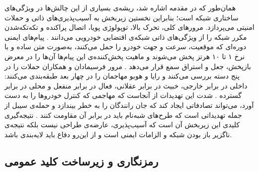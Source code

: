 همان‌طور که در مقدمه اشاره شد، ریشه‌ی بسیاری از این چالش‌ها در ویژگی‌های ساختاری شبکه است؛ بنابراین نخستین زیربخش به آسیب‌پذیری‌های ذاتی و حملات امنیتی می‌پردازد. مرورهای کلی، تحرک بالا، توپولوژی پویا، اتصال پراکنده و تکه‌تکه‌شدن مکرر شبکه را از ویژگی‌های ذاتی شبکه‌ی اقتضایی خودرویی می‌دانند \cite{hozouriOverviewVANETVehicular2023, xuInternetVehiclesBig2018}. پیام‌های ایمنی دوره‌ای که موقعیت، سرعت و جهت خودرو را حمل می‌کنند، به‌صورت متن ساده و با نرخ ۱ تا ۱۰ هرتز پخش می‌شوند \cite{al-aniPrivacySafetyImprovement2023} و ماهیت پخش‌کننده‌ی این پیام‌ها آن‌ها را در معرض بازپخش، جعل و استراق سمع قرار می‌دهد \cite{farsimadanReviewSecurityChallenges2025}. مرور فرسیمادان و همکاران حملات را در پنج دسته بررسی می‌کنند \cite{farsimadanReviewSecurityChallenges2025} و رایا و هوبو مهاجمان را در چهار بعد طبقه‌بندی می‌کنند: داخلی در برابر خارجی، خبیث در برابر عقلانی، فعال در برابر منفعل و محلی در برابر گسترده \cite{SecuringVehicularAd}. شدت این تهدیدات از آنجاست که مهاجمی که کنترل خودروها را به دست آورد، می‌تواند تصادفاتی ایجاد کند که جان رانندگان را به خطر بیندازد \cite{farsimadanReviewSecurityChallenges2025} و حمله‌ی سیبل از جمله تهدیداتی است که طرح‌های شبه‌نام باید در برابر آن مقاومت کنند \cite{rahmawatiagustinaSystematicLiteratureReview2025}. نتیجه‌گیری کلیدی این زیربخش آن است که آسیب‌پذیری، عارضه‌ی طراحی نیست بلکه نتیجه‌ی ناگزیر باز بودن شبکه و الزامات ایمنی است و از این‌رو دفاع باید لایه‌بندی باشد.

\subsection{رمزنگاری و زیرساخت کلید عمومی}

